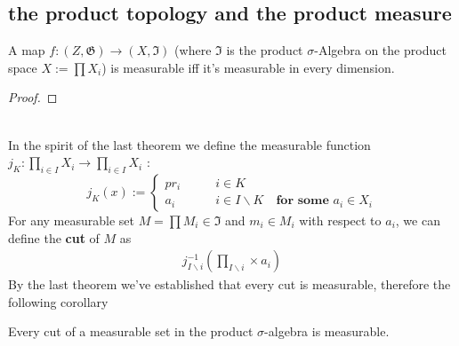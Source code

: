 \subsection{the product topology and the product measure}
\begin{theorem}
	A map $f: (Z, \mathfrak{G}) \rightarrow (X, \mathfrak{I})$ (where $\mathfrak{I}$ is the product $\sigma$-Algebra on the product space $X := \prod X_i$) is measurable iff it's measurable in every dimension.
\end{theorem}
\begin{proof}
\end{proof}
\quad\\
In the spirit of the last theorem we define the measurable function $j_K: \prod_{i \in I} X_i \rightarrow \prod_{i \in I} X_i$ :
\begin{equation*}
j_K(x) := \left\{
\begin{aligned}
	pr_i \qquad &i \in K\\
	a_i \qquad  &i \in I \backslash K \quad \textbf{for some $a_i \in X_i$}
\end{aligned}
\right.	
\end{equation*}
For any measurable set $M = \prod M_i \in \mathfrak{I}$ and $m_i \in M_i$ with respect to $a_i$, we can define the \textbf{cut} of $M$ as
\begin{align*}
	j_{I \backslash i} ^{-1}(\prod_{I \backslash i} \times a_i)
\end{align*}
By the last theorem we've established that every cut is measurable, therefore the following corollary
\begin{corollary}
	Every cut of a measurable set in the product $\sigma$-algebra is measurable.
\end{corollary}


